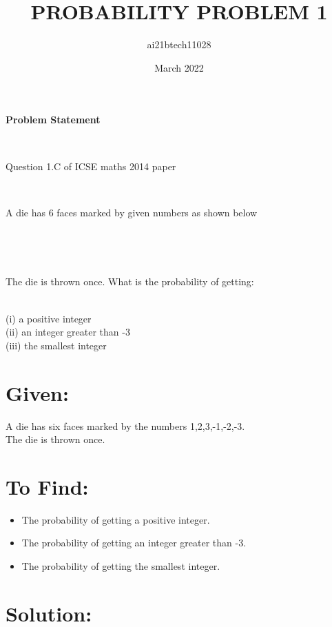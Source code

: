 \documentclass{article}
\title{PROBABILITY PROBLEM 1}
\author{ai21btech11028 }
\date{March 2022}
\begin{document}
\maketitle
\begin{center}\textbf{Problem Statement}\end{center}\\
\begin{center}Question 1.C of ICSE maths 2014 paper\end{center}\\
\begin{center}A die has 6 faces marked by given numbers as shown below\end{center}\\
\begin{center}\hspace{0.3cm}\hspace{0.3cm}\hspace{0.3cm}\hspace{0.3cm}\hspace{0.3cm}\end{center}\\
\begin{center}The die is thrown once. What is the probability of getting:\end{center}\\
(i)   a positive integer\\
(ii)  an integer greater than -3\\
(iii)  the smallest integer\\


\section{Given:}
A die has six faces marked by the numbers 1,2,3,-1,-2,-3.\\
The die is thrown once.
\section{To Find:}
\begin{itemize}
    \item The probability of getting a positive integer.
    \item The probability of getting an integer greater than -3.
    \item The probability of getting the smallest integer.
\end{itemize}
\section{Solution: }
\end{document}
